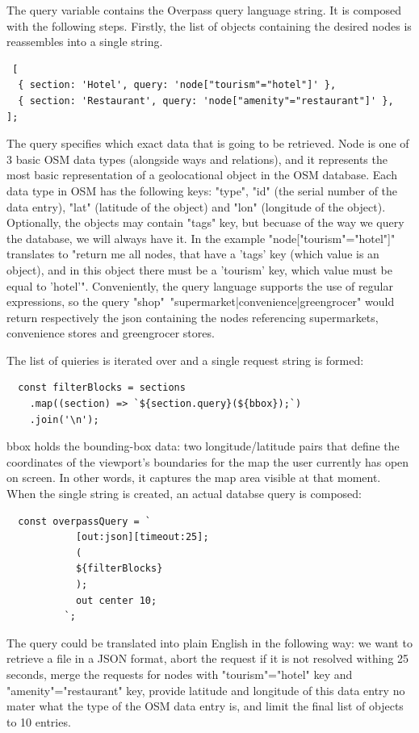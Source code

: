 The query variable contains the Overpass query language string. It is composed with the following steps. Firstly, the list of objects containing the desired nodes is reassembles into a single string. 
\begin{verbatim} 
 [
  { section: 'Hotel', query: 'node["tourism"="hotel"]' },
  { section: 'Restaurant', query: 'node["amenity"="restaurant"]' },
];
\end{verbatim}
The query specifies which exact data that is going to be retrieved. Node is one of 3 basic OSM data types (alongside ways and relations), and it represents the most basic representation of a geolocational object in the OSM database. Each data type in OSM has the following keys: "type", "id" (the serial number of the data entry), "lat" (latitude of the object) and "lon" (longitude of the object). Optionally, the objects may contain "tags" key, but becuase of the way we query the database, we will always have it. In the example "node["tourism"="hotel"]" translates to "return me all nodes, that have a 'tags' key (which value is an object), and in this object there must be a 'tourism' key, which value must be equal to 'hotel'". Conveniently, the query language supports the use of regular expressions, so the query "shop"~"supermarket|convenience|greengrocer" would return respectively the json containing the nodes referencing supermarkets, convenience stores and greengrocer stores.

The list of quieries is iterated over and a single request string is formed:
\begin{verbatim} 
  const filterBlocks = sections
    .map((section) => `${section.query}(${bbox});`)
    .join('\n');
\end{verbatim}
bbox holds the bounding-box data: two longitude/latitude pairs that define the coordinates of the viewport’s boundaries for the map the user currently has open on screen. In other words, it captures the map area visible at that moment. When the single string is created, an actual databse query is composed: 
\begin{verbatim} 
  const overpassQuery = `
            [out:json][timeout:25];
            (
            ${filterBlocks}
            );
            out center 10;
          `;
\end{verbatim}
The query could be translated into plain English in the following way: we want to retrieve a file in a JSON format, abort the request if it is not resolved withing 25 seconds, merge the requests for nodes with "tourism"="hotel" key and "amenity"="restaurant" key, provide latitude and longitude of this data entry no mater what the type of the OSM data entry is, and limit the final list of objects to 10 entries. 

